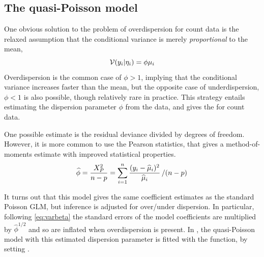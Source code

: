 \documentclass[11pt]{book}\usepackage[]{graphicx}\usepackage[]{color}
\begin{document}
\subsection{The quasi-Poisson model}\label{sec:glm-quasi}

One obvious solution to the problem of overdispersion for count data is the relaxed assumption
that the conditional variance is merely \emph{proportional} to the mean,
\begin{equation*}
\mathcal{V} (y_i | \eta_i) = \phi \mu_i
\end{equation*}
Overdispersion is the common case of $\phi > 1$, implying that the conditional variance
increases faster than the mean, but the opposite case of underdispersion, $\phi < 1$
is also possible, though relatively rare in practice.
This strategy entails estimating the dispersion parameter $\phi$ from the data,
and gives the  for count data.

One possible estimate is the residual deviance divided by degrees of freedom.
However, it is more common to use the Pearson statistics, that gives
a method-of-moments estimate with improved statistical properties.
\begin{equation*}
\widehat{\phi} =
\frac{X^2_P}{n-p} =
\sum_{i=1}^n \frac{(y_i - \widehat{\mu}_i)^2}{\widehat{\mu}_i} \left/ (n-p) \right.
\end{equation*}

It turns out that this model gives the same coefficient estimates as the standard
Poisson GLM, but inference is adjusted for over/under dispersion.
In particular, following \eqref{eq:varbeta}
the standard errors of the model coefficients are multiplied by
$\widehat{\phi}^{1/2}$ and so are inflated when overdispersion is present.
In \R, the quasi-Poisson model with this estimated dispersion parameter is
fitted with the  function, by setting .
\end{document}
